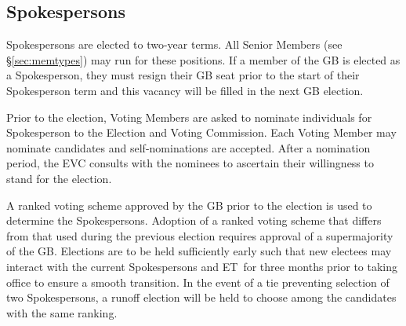 \documentclass[12pt]{article}
\newcommand{\exec}{{Executive Team}}
\newcommand{\shorte}{{ET}}  %
\begin{document}
\subsection{Spokespersons}

Spokespersons are elected to two-year terms. All Senior Members (see \S\ref{sec:memtypes}) may  run for these positions.  %
If a member of the GB is elected as a Spokesperson, they must resign their GB seat prior to the start of their Spokesperson term and this vacancy will be filled in the next GB election. 

Prior to the election, Voting Members are asked to nominate individuals for Spokesperson to the Election and Voting Commission. Each Voting Member may nominate  candidates and self-nominations are accepted. %
After a nomination period, the EVC consults with the nominees to ascertain their willingness to stand for the election.

\textcolor{\markcolor} {A ranked voting scheme approved by the GB prior to the election %
is used to determine the Spokespersons.  Adoption of a ranked voting scheme that differs from that used during the previous election requires approval of a supermajority of the GB.  Elections are to be held sufficiently early such that new electees may interact with the current Spokespersons and \shorte\ for three months prior to taking office to ensure a smooth transition. %
In the event of a tie preventing selection of two Spokespersons, a runoff election will be held to choose among the candidates with the same ranking.} %

\end{document}
